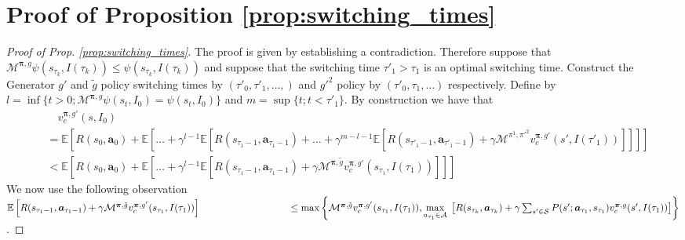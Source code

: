 \documentclass{article}
\begin{document}
\section*{Proof of Proposition \ref{prop:switching_times}}
\begin{proof}[Proof of Prop. \ref{prop:switching_times}]
The proof is given by establishing a contradiction. Therefore suppose that $\mathcal{M}^{\boldsymbol{\pi},g}\psi(s_{\tau_k},I(\tau_k))\leq \psi(s_{\tau_k},I(\tau_k))$ and suppose that the switching time $\tau'_1>\tau_1$ is an optimal switching time. Construct the {\selectfont Generator} $g'$ and $\tilde{g}$ policy switching times by $(\tau'_0,\tau'_1,\ldots,)$ and $g'^2$ policy by $(\tau'_0,\tau_1,\ldots)$ respectively.  Define by $l=\inf\{t>0;\mathcal{M}^{\boldsymbol{\pi},g}\psi(s_{t},I_0)= \psi(s_{t},I_0)\}$ and $m=\sup\{t;t<\tau'_1\}$.
By construction we have that
\begin{align*}
& \quad v^{\boldsymbol{\pi},g'}_c(s,I_0)
\\&=\mathbb{E}\left[R(s_{0},\boldsymbol{a}_{0})+\mathbb{E}\left[\ldots+\gamma^{l-1}\mathbb{E}\left[R(s_{\tau_1-1},\boldsymbol{a}_{\tau_1-1})+\ldots+\gamma^{m-l-1}\mathbb{E}\left[ R(s_{\tau'_1-1},\boldsymbol{a}_{\tau'_1-1})+\gamma\mathcal{M}^{\pi^1,\pi'^2}v^{\boldsymbol{\pi},g'}_c(s',I(\tau'_{1}))\right]\right]\right]\right]
\\&<\mathbb{E}\left[R(s_{0},\boldsymbol{a}_{0})+\mathbb{E}\left[\ldots+\gamma^{l-1}\mathbb{E}\left[ R(s_{\tau_1-1},\boldsymbol{a}_{\tau_1-1})+\gamma\mathcal{M}^{\boldsymbol{\pi},\tilde{g}}v^{\boldsymbol{\pi},g'}_c(s_{\tau_1},I(\tau_1))\right]\right]\right]
\end{align*}
We now use the following observation $\mathbb{E}\left[ R(s_{\tau_1-1},\boldsymbol{a}_{\tau_1-1})+\gamma\mathcal{M}^{\boldsymbol{\pi},\tilde{g}}v^{\boldsymbol{\pi},g'}_c(s_{\tau_1},I(\tau_1))\right]\\\ \text{\hspace{30 mm}}\leq \max\left\{\mathcal{M}^{\boldsymbol{\pi},\tilde{g}}v^{\boldsymbol{\pi},g'}_c(s_{\tau_1},I(\tau_1)),\underset{a_{\tau_1}\in\mathcal{A}}{\max}\;\left[ R(s_{\tau_{k}},\boldsymbol{a}_{\tau_{k}})+\gamma\sum_{s'\in\mathcal{S}}P(s';\boldsymbol{a}_{\tau_1},s_{\tau_1})v^{\boldsymbol{\pi},g}_c(s',I(\tau_1))\right]\right\}$.


\end{proof}
\end{document}
